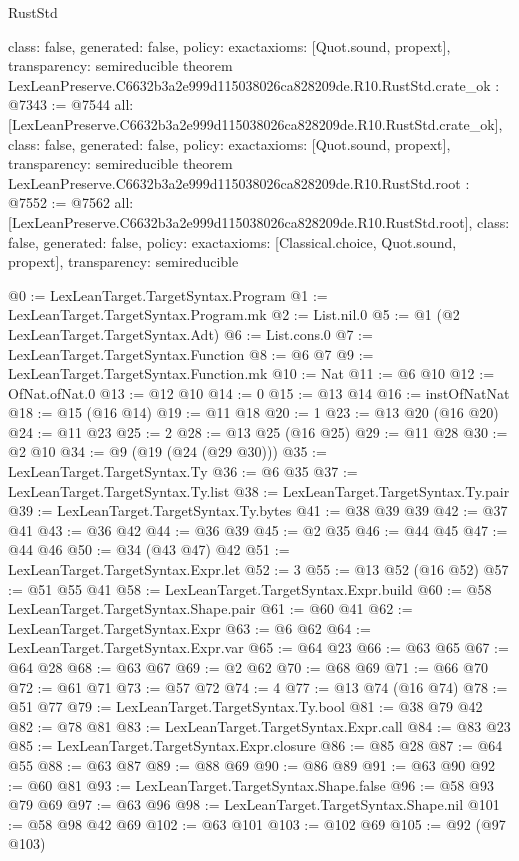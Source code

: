 \begin{lexlean}{RustStd}
\begin{coremodule}
{  class: false,
  generated: false,
  policy: exact{axioms: [Quot.sound, propext]},
  transparency: semireducible
}
theorem LexLeanPreserve.C6632b3a2e999d115038026ca828209de.R10.RustStd.crate_ok : @7343 := @7544 {
  all: [LexLeanPreserve.C6632b3a2e999d115038026ca828209de.R10.RustStd.crate_ok],
  class: false,
  generated: false,
  policy: exact{axioms: [Quot.sound, propext]},
  transparency: semireducible
}
theorem LexLeanPreserve.C6632b3a2e999d115038026ca828209de.R10.RustStd.root : @7552 := @7562 {
  all: [LexLeanPreserve.C6632b3a2e999d115038026ca828209de.R10.RustStd.root],
  class: false,
  generated: false,
  policy: exact{axioms: [Classical.choice, Quot.sound, propext]},
  transparency: semireducible
}

@0 := LexLeanTarget.TargetSyntax.Program
@1 := LexLeanTarget.TargetSyntax.Program.mk
@2 := List.nil.{0}
@5 := @1 (@2 LexLeanTarget.TargetSyntax.Adt)
@6 := List.cons.{0}
@7 := LexLeanTarget.TargetSyntax.Function
@8 := @6 @7
@9 := LexLeanTarget.TargetSyntax.Function.mk
@10 := Nat
@11 := @6 @10
@12 := OfNat.ofNat.{0}
@13 := @12 @10
@14 := 0
@15 := @13 @14
@16 := instOfNatNat
@18 := @15 (@16 @14)
@19 := @11 @18
@20 := 1
@23 := @13 @20 (@16 @20)
@24 := @11 @23
@25 := 2
@28 := @13 @25 (@16 @25)
@29 := @11 @28
@30 := @2 @10
@34 := @9 (@19 (@24 (@29 @30)))
@35 := LexLeanTarget.TargetSyntax.Ty
@36 := @6 @35
@37 := LexLeanTarget.TargetSyntax.Ty.list
@38 := LexLeanTarget.TargetSyntax.Ty.pair
@39 := LexLeanTarget.TargetSyntax.Ty.bytes
@41 := @38 @39 @39
@42 := @37 @41
@43 := @36 @42
@44 := @36 @39
@45 := @2 @35
@46 := @44 @45
@47 := @44 @46
@50 := @34 (@43 @47) @42
@51 := LexLeanTarget.TargetSyntax.Expr.let
@52 := 3
@55 := @13 @52 (@16 @52)
@57 := @51 @55 @41
@58 := LexLeanTarget.TargetSyntax.Expr.build
@60 := @58 LexLeanTarget.TargetSyntax.Shape.pair
@61 := @60 @41
@62 := LexLeanTarget.TargetSyntax.Expr
@63 := @6 @62
@64 := LexLeanTarget.TargetSyntax.Expr.var
@65 := @64 @23
@66 := @63 @65
@67 := @64 @28
@68 := @63 @67
@69 := @2 @62
@70 := @68 @69
@71 := @66 @70
@72 := @61 @71
@73 := @57 @72
@74 := 4
@77 := @13 @74 (@16 @74)
@78 := @51 @77
@79 := LexLeanTarget.TargetSyntax.Ty.bool
@81 := @38 @79 @42
@82 := @78 @81
@83 := LexLeanTarget.TargetSyntax.Expr.call
@84 := @83 @23
@85 := LexLeanTarget.TargetSyntax.Expr.closure
@86 := @85 @28
@87 := @64 @55
@88 := @63 @87
@89 := @88 @69
@90 := @86 @89
@91 := @63 @90
@92 := @60 @81
@93 := LexLeanTarget.TargetSyntax.Shape.false
@96 := @58 @93 @79 @69
@97 := @63 @96
@98 := LexLeanTarget.TargetSyntax.Shape.nil
@101 := @58 @98 @42 @69
@102 := @63 @101
@103 := @102 @69
@105 := @92 (@97 @103)

\end{coremodule}
\end{lexlean}
